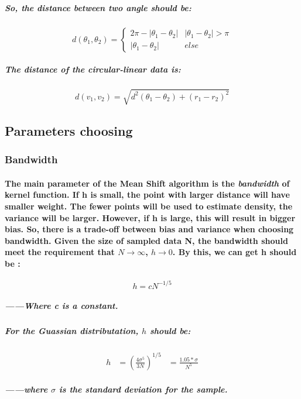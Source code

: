 \documentclass{article}
\begin{document}
\subparagraph{
    So, the distance between two angle should be:
}

\begin{equation}
    d(\theta_1, \theta_2) =
    \begin{cases}
    2\pi - |\theta_1 - \theta_2| &|\theta_1 - \theta_2|>\pi\\
    |\theta_1 - \theta_2|  &else
    \end{cases}
\end{equation}

\subparagraph{
    The distance of the circular-linear data is:
}

\begin{equation}
    d(v_1,v_2) = \sqrt{d^2(\theta_1 - \theta_2) + (r_1 - r_2)^2}
\end{equation}

\subsection{Parameters choosing}
\subsubsection{Bandwidth}
\paragraph{
    The main parameter of the Mean Shift algorithm is the \textit{bandwidth} of kernel function.
    If h is small, the point with larger distance will have smaller weight. The fewer points will be used to estimate density, the variance will be larger. However, if h is large, this will result in bigger bias.
    So, there is a trade-off between bias and variance when choosing bandwidth. Given the size of sampled data N, the bandwidth should meet the requirement that $N\rightarrow \infty$, $h \rightarrow 0$. By this, we can get h should be :
}

\begin{equation}
    h = cN^{-1/5}
\end{equation}
\subparagraph{
    ——Where c is a constant.
}
\subparagraph{
    For the Guassian distributation, $h$ should be:
}

\begin{equation}
\begin{aligned}
    h &= (\frac{4\sigma^5}{3N})^{1/5}
&=\frac{1.05 * \sigma}{N^5}
\end{aligned}
\end{equation}
\subparagraph{——where $\sigma$ is the standard deviation for  the sample.}
\end{document}
